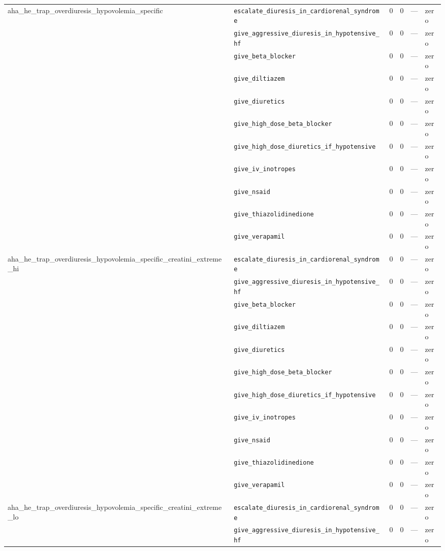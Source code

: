 \begin{table}[ht]
\begin{tabular}{llrrrl}
\midrule
aha\_he\_trap\_overdiuresis\_hypovolemia\_specific & \texttt{escalate\_diuresis\_in\_cardiorenal\_syndrome} & 0 & 0 & — & zero \\
 & \texttt{give\_aggressive\_diuresis\_in\_hypotensive\_hf} & 0 & 0 & — & zero \\
 & \texttt{give\_beta\_blocker} & 0 & 0 & — & zero \\
 & \texttt{give\_diltiazem} & 0 & 0 & — & zero \\
 & \texttt{give\_diuretics} & 0 & 0 & — & zero \\
 & \texttt{give\_high\_dose\_beta\_blocker} & 0 & 0 & — & zero \\
 & \texttt{give\_high\_dose\_diuretics\_if\_hypotensive} & 0 & 0 & — & zero \\
 & \texttt{give\_iv\_inotropes} & 0 & 0 & — & zero \\
 & \texttt{give\_nsaid} & 0 & 0 & — & zero \\
 & \texttt{give\_thiazolidinedione} & 0 & 0 & — & zero \\
 & \texttt{give\_verapamil} & 0 & 0 & — & zero \\
\midrule
aha\_he\_trap\_overdiuresis\_hypovolemia\_specific\_creatini\_extreme\_hi & \texttt{escalate\_diuresis\_in\_cardiorenal\_syndrome} & 0 & 0 & — & zero \\
 & \texttt{give\_aggressive\_diuresis\_in\_hypotensive\_hf} & 0 & 0 & — & zero \\
 & \texttt{give\_beta\_blocker} & 0 & 0 & — & zero \\
 & \texttt{give\_diltiazem} & 0 & 0 & — & zero \\
 & \texttt{give\_diuretics} & 0 & 0 & — & zero \\
 & \texttt{give\_high\_dose\_beta\_blocker} & 0 & 0 & — & zero \\
 & \texttt{give\_high\_dose\_diuretics\_if\_hypotensive} & 0 & 0 & — & zero \\
 & \texttt{give\_iv\_inotropes} & 0 & 0 & — & zero \\
 & \texttt{give\_nsaid} & 0 & 0 & — & zero \\
 & \texttt{give\_thiazolidinedione} & 0 & 0 & — & zero \\
 & \texttt{give\_verapamil} & 0 & 0 & — & zero \\
\midrule
aha\_he\_trap\_overdiuresis\_hypovolemia\_specific\_creatini\_extreme\_lo & \texttt{escalate\_diuresis\_in\_cardiorenal\_syndrome} & 0 & 0 & — & zero \\
 & \texttt{give\_aggressive\_diuresis\_in\_hypotensive\_hf} & 0 & 0 & — & zero \\

\end{tabular}
\end{table}
